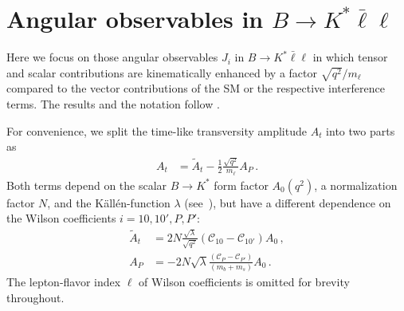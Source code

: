 \documentclass[twocolumn,epjc3]{svjour3}
\numberwithin{equation}{section}
\newcommand{\checked}[1]{{\color{brown}{ {\bf Checked: }{#1}}}}
\renewcommand{\checked}[1]{#1}
\newcommand{\wilson}[2][{}]{\mathcal{C}_{#2}^{\mathrm{#1}}}
\renewcommand{\[}{\big[}
\renewcommand{\]}{\big]}
\renewcommand{\(}{\big(}
\renewcommand{\)}{\big)}
\begin{document}
\section{
  \checked{Angular observables in $B\to K^* \bar\ell\ell$}
  \label{app:BKstarellell}
}

Here we focus on those angular observables $J_i$ in $B\to K^* \bar\ell\ell$ in
which tensor and scalar contributions are kinematically enhanced by a factor
$\sqrt{q^2}/m_\ell$ compared to the vector contributions of the SM or the
respective interference terms. The results and the notation follow
\cite{Bobeth:2012vn}.

For convenience, we split the time-like transversity amplitude $A_t$ into two
parts as
\begin{align}
  A_t &
  = \tilde{A}_t - \frac{1}{2} \frac{\sqrt{q^2}}{m_\ell} A_P \, .
\end{align}
Both terms depend on the scalar $B\to K^*$ form factor $A_0(q^2)$, a
normalization factor $N$, and the K{\"a}ll{\'e}n-function $\lambda$
(see~\cite{Bobeth:2012vn}), but have a different dependence on the
Wilson coefficients $i = 10, 10', P, P'$:
\begin{equation}
\begin{aligned}
  \tilde{A}_t & = 2 N \frac{\sqrt{\lambda}}{\sqrt{q^2}}
    (\wilson[]{10} - \wilson[]{10'}) A_0\,,
\\
  A_P & = - 2 N\sqrt{\lambda} \frac{(\wilson[]{P} - \wilson[]{P'})}{(m_b+m_s)} A_0\,.
\end{aligned}
\end{equation}
The lepton-flavor index $\ell$ of Wilson coefficients is omitted for brevity
throughout.
\end{document}
